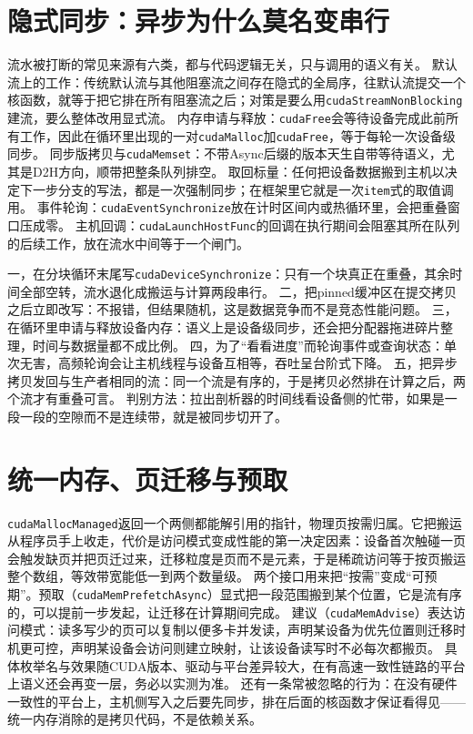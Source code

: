 \documentclass[12pt,a4paper,fontset=fandol]{ctexbook}
\newcommand{\Tp}[1]{\texttt{#1}}
\begin{document}
\section{隐式同步：异步为什么莫名变串行}

流水被打断的常见来源有六类，都与代码逻辑无关，只与调用的语义有关。
默认流上的工作：传统默认流与其他阻塞流之间存在隐式的全局序，往默认流提交一个核函数，就等于把它排在所有阻塞流之后；对策是要么用\Tp{cudaStreamNonBlocking}建流，要么整体改用显式流。
内存申请与释放：\Tp{cudaFree}会等待设备完成此前所有工作，因此在循环里出现的一对\Tp{cudaMalloc}加\Tp{cudaFree}，等于每轮一次设备级同步。
同步版拷贝与\Tp{cudaMemset}：不带Async后缀的版本天生自带等待语义，尤其是D2H方向，顺带把整条队列排空。
取回标量：任何把设备数据搬到主机以决定下一步分支的写法，都是一次强制同步；在框架里它就是一次\Tp{item}式的取值调用。
事件轮询：\Tp{cudaEventSynchronize}放在计时区间内或热循环里，会把重叠窗口压成零。
主机回调：\Tp{cudaLaunchHostFunc}的回调在执行期间会阻塞其所在队列的后续工作，放在流水中间等于一个闸门。

\begin{warning}[title={五种把异步流水意外变成串行的写法}]
一，在分块循环末尾写\Tp{cudaDeviceSynchronize}：只有一个块真正在重叠，其余时间全部空转，流水退化成搬运与计算两段串行。
二，把pinned缓冲区在提交拷贝之后立即改写：不报错，但结果随机，这是数据竞争而不是竞态性能问题。
三，在循环里申请与释放设备内存：语义上是设备级同步，还会把分配器拖进碎片整理，时间与数据量都不成比例。
四，为了``看看进度''而轮询事件或查询状态：单次无害，高频轮询会让主机线程与设备互相等，吞吐呈台阶式下降。
五，把异步拷贝发回与生产者相同的流：同一个流是有序的，于是拷贝必然排在计算之后，两个流才有重叠可言。
判别方法：拉出剖析器的时间线看设备侧的忙带，如果是一段一段的空隙而不是连续带，就是被同步切开了。
\end{warning}

\section{统一内存、页迁移与预取}

\Tp{cudaMallocManaged}返回一个两侧都能解引用的指针，物理页按需归属。它把搬运从程序员手上收走，代价是访问模式变成性能的第一决定因素：设备首次触碰一页会触发缺页并把页迁过来，迁移粒度是页而不是元素，于是稀疏访问等于按页搬运整个数组，等效带宽能低一到两个数量级。
两个接口用来把``按需''变成``可预期''。预取（\Tp{cudaMemPrefetchAsync}）显式把一段范围搬到某个位置，它是流有序的，可以提前一步发起，让迁移在计算期间完成。
建议（\Tp{cudaMemAdvise}）表达访问模式：读多写少的页可以复制以便多卡并发读，声明某设备为优先位置则迁移时机更可控，声明某设备会访问则建立映射，让该设备读写时不必每次都搬页。
具体枚举名与效果随CUDA版本、驱动与平台差异较大，在有高速一致性链路的平台上语义还会再变一层，务必以实测为准。
还有一条常被忽略的行为：在没有硬件一致性的平台上，主机侧写入之后要先同步，排在后面的核函数才保证看得见——统一内存消除的是拷贝代码，不是依赖关系。
\end{document}
